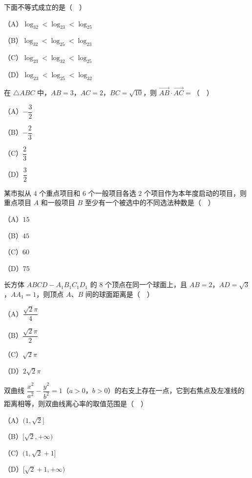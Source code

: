\begin{question}
下面不等式成立的是（　）

（A）$\log_32<\log_23<\log_25$

（B）$\log_32<\log_25<\log_23$

（C）$\log_23<\log_32<\log_25$

（D）$\log_23<\log_25<\log_32$

\end{question}
\begin{question}
在 $\triangle ABC$ 中，$AB=3$，$AC=2$，$BC=\sqrt{10}$，则 $\overrightarrow{AB}\cdot\overrightarrow{AC}=$（　）

（A）$-\dfrac32$

（B）$-\dfrac23$

（C）$\dfrac23$

（D）$\dfrac32$

\end{question}
\begin{question}
某市拟从 $4$ 个重点项目和 $6$ 个一般项目各选 $2$ 个项目作为本年度启动的项目，则重点项目 $A$ 和一般项目 $B$ 至少有一个被选中的不同选法种数是（　）

（A）$15$

（B）$45$

（C）$60$

（D）$75$

\end{question}
\begin{question}
长方体 $ABCD-A_1B_1C_1D_1$ 的 $8$ 个顶点在同一个球面上，且 $AB=2$，$AD=\sqrt3$，$AA_1=1$，则顶点 $A$、$B$ 间的球面距离是（　）

（A）$\dfrac{\sqrt2\pi}4$

（B）$\dfrac{\sqrt2\pi}2$

（C）$\sqrt2\pi$

（D）$2\sqrt2\pi$

\end{question}
\begin{question}
双曲线 $\dfrac{x^2}{a^2}-\dfrac{y^2}{b^2}=1$（$a>0$，$b>0$）的右支上存在一点，它到右焦点及左准线的距离相等，则双曲线离心率的取值范围是（　）

（A）$(1,\sqrt2]$

（B）$[\sqrt2,+\infty)$

（C）$(1,\sqrt2+1]$

（D）$[\sqrt2+1,+\infty)$

\end{question}

